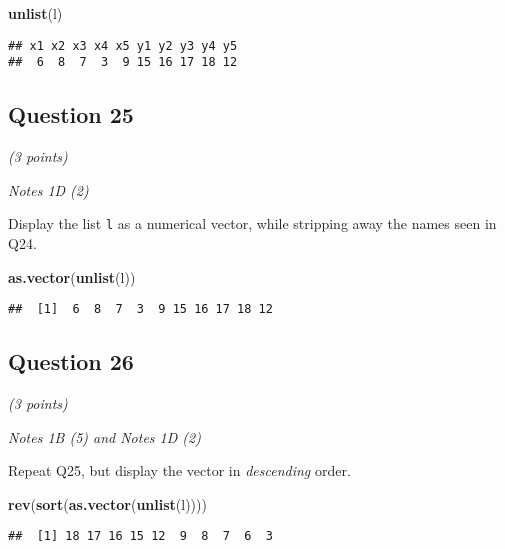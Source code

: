 \documentclass[
]{article}
\newenvironment{Shaded}{\begin{snugshade}}{\end{snugshade}}
\newcommand{\KeywordTok}[1]{\textcolor[rgb]{0.13,0.29,0.53}{\textbf{#1}}}
\newcommand{\NormalTok}[1]{#1}
\begin{document}
\begin{Shaded}
\begin{Highlighting}[]
\KeywordTok{unlist}\NormalTok{(l)}
\end{Highlighting}
\end{Shaded}

\begin{verbatim}
## x1 x2 x3 x4 x5 y1 y2 y3 y4 y5 
##  6  8  7  3  9 15 16 17 18 12
\end{verbatim}

\hypertarget{question-25}{%
\subsection{Question 25}\label{question-25}}

\emph{(3 points)}

\emph{Notes 1D (2)}

Display the list \texttt{l} as a numerical vector, while stripping away
the names seen in Q24.

\begin{Shaded}
\begin{Highlighting}[]
\KeywordTok{as.vector}\NormalTok{(}\KeywordTok{unlist}\NormalTok{(l))}
\end{Highlighting}
\end{Shaded}

\begin{verbatim}
##  [1]  6  8  7  3  9 15 16 17 18 12
\end{verbatim}

\hypertarget{question-26}{%
\subsection{Question 26}\label{question-26}}

\emph{(3 points)}

\emph{Notes 1B (5) and Notes 1D (2)}

Repeat Q25, but display the vector in \emph{descending} order.

\begin{Shaded}
\begin{Highlighting}[]
\KeywordTok{rev}\NormalTok{(}\KeywordTok{sort}\NormalTok{(}\KeywordTok{as.vector}\NormalTok{(}\KeywordTok{unlist}\NormalTok{(l))))}
\end{Highlighting}
\end{Shaded}

\begin{verbatim}
##  [1] 18 17 16 15 12  9  8  7  6  3
\end{verbatim}
\end{document}
